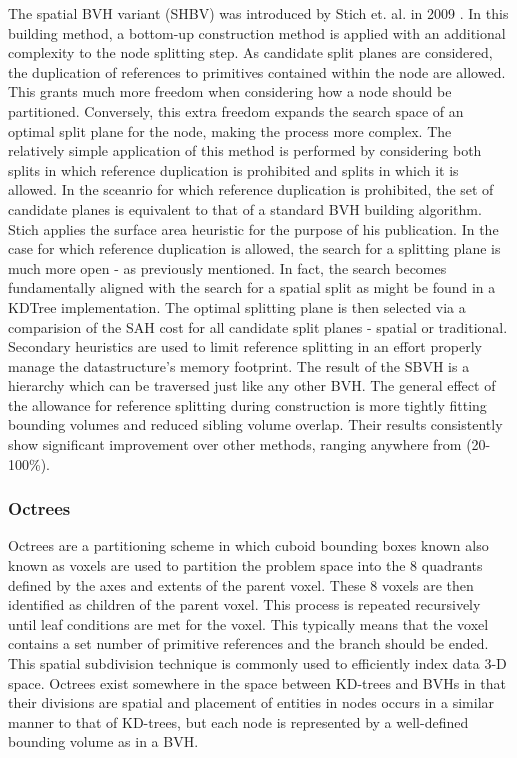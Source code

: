 \documentclass[12pt, a4paper]{article}
\begin{document}
The spatial BVH variant (SHBV) was introduced by Stich et. al. in 2009 \cite{sbvh}. In this building method, a bottom-up construction method is applied with an additional complexity to the node splitting step. As candidate split planes are considered, the duplication of references to primitives contained within the node are allowed. This grants much more freedom when considering how a node should be partitioned. Conversely, this extra freedom expands the search space of an optimal split plane for the node, making the process more complex. The relatively simple application of this method is performed by considering both splits in which reference duplication is prohibited and splits in which it is allowed. In the sceanrio for which reference duplication is prohibited, the set of candidate planes is equivalent to that of a standard BVH building algorithm. Stich applies the surface area heuristic for the purpose of his publication. In the case for which reference duplication is allowed, the search for a splitting plane is much more open - as previously mentioned. In fact, the search becomes fundamentally aligned with the search for a spatial split as might be found in a KDTree implementation. The optimal splitting plane is then selected via a comparision of the SAH cost for all candidate split planes - spatial or traditional. Secondary heuristics are used to limit reference splitting in an effort properly manage the datastructure's memory footprint. The result of the SBVH is a hierarchy which can be traversed just like any other BVH. The general effect of the allowance for reference splitting during construction is more tightly fitting bounding volumes and reduced sibling volume overlap. Their results consistently show significant improvement over other methods, ranging anywhere from (20-100\%).\cite{sbvh}


\subsubsection{Octrees}%
\label{sec:octree}
Octrees are a partitioning scheme in which cuboid bounding boxes known also known as voxels are used to partition the problem space into the 8 quadrants defined by the axes and extents of the parent voxel. These 8 voxels are then identified as children of the parent voxel. This process is repeated recursively until leaf conditions are met for the voxel. This typically means that the voxel contains a set number of primitive references and the branch should be ended. This spatial subdivision technique is commonly used to efficiently index data 3-D space.\cite{Intro2RT} Octrees exist somewhere in the space between KD-trees and BVHs in that their divisions are spatial and placement of entities in nodes occurs in a similar manner to that of KD-trees, but each node is represented by a well-defined bounding volume as in a BVH.
\end{document}
